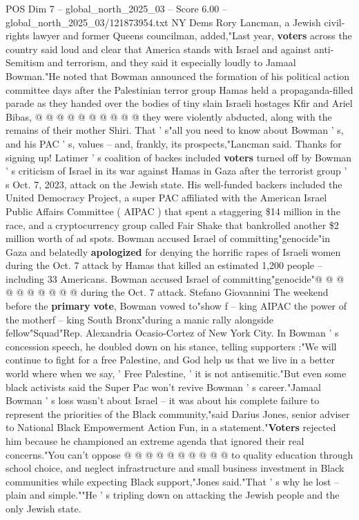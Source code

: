 \begin{textsample}{POS Dim 7 – global\_north\_2025\_03 – Score 6.00 – global\_north\_2025\_03/121873954.txt}
NY Dems Rory Lancman, a Jewish civil-rights lawyer and former Queens councilman, added,"Last year, \textbf{voters} across the country said loud and clear that America stands with Israel and against anti-Semitism and terrorism, and they said it especially loudly to Jamaal Bowman."He noted that Bowman announced the formation of his political action committee days after the Palestinian terror group Hamas held a propaganda-filled parade as they handed over the bodies of tiny slain Israeli hostages Kfir and Ariel Bibas, @ @ @ @ @ @ @ @ @ @ they were violently abducted, along with the remains of their mother Shiri.
That ' s"all you need to know about Bowman ' s, and his PAC ' s, values -- and, frankly, its prospects,"Lancman said.
Thanks for signing up!
Latimer ' s coalition of backes included \textbf{voters} turned off by Bowman ' s criticism of Israel in its war against Hamas in Gaza after the terrorist group ' s Oct. 7, 2023, attack on the Jewish state.
His well-funded backers included the United Democracy Project, a super PAC affiliated with the American Israel Public Affairs Committee ( AIPAC ) that spent a staggering \$14 million in the race, and a cryptocurrency group called Fair Shake that bankrolled another \$2 million worth of ad spots.
Bowman accused Israel of committing"genocide"in Gaza and belatedly \textbf{apologized} for denying the horrific rapes of Israeli women during the Oct. 7 attack by Hamas that killed an estimated 1,200 people -- including 33 Americans.
Bowman accused Israel of committing"genocide"@ @ @ @ @ @ @ @ @ @ during the Oct. 7 attack.
Stefano Giovannini The weekend before the \textbf{primary} \textbf{vote}, Bowman vowed to"show f -- king AIPAC the power of the motherf -- king South Bronx"during a manic rally alongside fellow"Squad"Rep.
Alexandria Ocasio-Cortez of New York City.
In Bowman ' s concession speech, he doubled down on his stance, telling supporters :"We will continue to fight for a free Palestine, and God help us that we live in a better world where when we say, ' Free Palestine, ' it is not antisemitic."But even some black activists said the Super Pac won't revive Bowman ' s career."Jamaal Bowman ' s loss wasn't about Israel -- it was about his complete failure to represent the priorities of the Black community,"said Darius Jones, senior adviser to National Black Empowerment Action Fun, in a statement."\textbf{Voters} rejected him because he championed an extreme agenda that ignored their real concerns."You can't oppose @ @ @ @ @ @ @ @ @ @ to quality education through school choice, and neglect infrastructure and small business investment in Black communities while expecting Black support,"Jones said."That ' s why he lost -- plain and simple.""He ' s tripling down on attacking the Jewish people and the only Jewish state.

\end{textsample}
